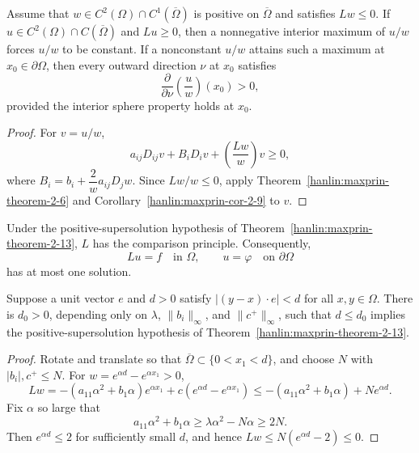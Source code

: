 \begin{theorem}\label{hanlin:maxprin-theorem-2-13}
Assume that $w\in C^2(\Omega)\cap C^1(\overline\Omega)$ is positive on
$\overline\Omega$ and satisfies $Lw\le0$. If
$u\in C^2(\Omega)\cap C(\overline\Omega)$ and $Lu\ge0$, then a nonnegative
interior maximum of $u/w$ forces $u/w$ to be constant. If a nonconstant $u/w$
attains such a maximum at $x_0\in\partial\Omega$, then every outward direction
$\nu$ at $x_0$ satisfies
\[
\frac{\partial}{\partial\nu}\left(\frac{u}{w}\right)(x_0)>0,
\]
provided the interior sphere property holds at $x_0$.
\end{theorem}
\begin{proof}
\sketch For $v=u/w$,
\[
a_{ij}D_{ij}v+B_iD_iv+\left(\frac{Lw}{w}\right)v\ge 0,
\]
where $B_i=b_i+\dfrac{2}{w}a_{ij}D_jw$. Since $Lw/w\le0$, apply
Theorem~\ref{hanlin:maxprin-theorem-2-6} and
Corollary~\ref{hanlin:maxprin-cor-2-9} to $v$.
\end{proof}

\begin{remark}\label{hanlin:maxprin-remark-2-14}


Under the positive-supersolution hypothesis of
Theorem~\ref{hanlin:maxprin-theorem-2-13}, $L$ has the comparison principle.
Consequently,
\[
Lu=f\quad\text{in }\Omega,
\qquad
u=\varphi\quad\text{on }\partial\Omega
\]
has at most one solution.
\end{remark}

\begin{proposition}\label{hanlin:maxprin-prop-2-15}


Suppose a unit vector $e$ and $d>0$ satisfy
$|(y-x)\cdot e|<d$ for all $x,y\in\Omega$. There is $d_0>0$, depending only
on $\lambda$, $\|b_i\|_\infty$, and $\|c^+\|_\infty$, such that $d\le d_0$
implies the positive-supersolution hypothesis of
Theorem~\ref{hanlin:maxprin-theorem-2-13}.
\end{proposition}
\begin{proof}
\sketch Rotate and translate so that $\overline\Omega\subset\{0<x_1<d\}$,
and choose $N$ with $|b_i|,c^+\le N$. For
$w=e^{\alpha d}-e^{\alpha x_1}>0$,
\[
Lw=-(a_{11}\alpha^2+b_1\alpha)e^{\alpha x_1}+c(e^{\alpha d}-e^{\alpha x_1})
\le -(a_{11}\alpha^2+b_1\alpha)+Ne^{\alpha d}.
\]
Fix $\alpha$ so large that
\[
a_{11}\alpha^2+b_1\alpha\ge \lambda\alpha^2-N\alpha\ge 2N.
\]
Then $e^{\alpha d}\le2$ for sufficiently small $d$, and hence
$Lw\le N(e^{\alpha d}-2)\le0$.
\end{proof}

